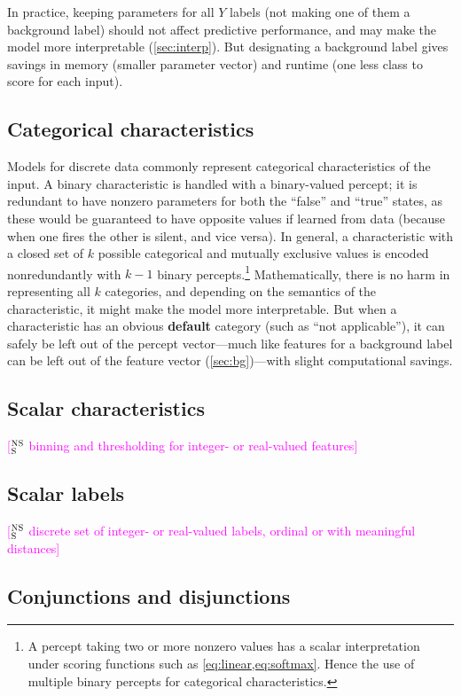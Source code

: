 \documentclass[11pt,letterpaper]{article}
\newcommand{\ensuretext}[1]{#1}
\newcommand{\nssmarker}{\ensuretext{\textcolor{magenta}{\ensuremath{^{\textsc{NS}}_{\textsc{S}}}}}}
\newcommand{\arkcomment}[3]{\ensuretext{\textcolor{#3}{[#1 #2]}}}
\newcommand{\nss}[1]{\arkcomment{\nssmarker}{#1}{magenta}}
\begin{document}
In practice, keeping parameters for all $Y$ labels (not making one of them a background label) 
should not affect predictive performance, and may make the model more interpretable (\cref{sec:interp}).
But designating a background label gives savings in memory (smaller parameter vector) and runtime (one less class to score for each input).

\subsection{Categorical characteristics}

Models for discrete data commonly represent categorical characteristics of the input.
A binary characteristic is handled with a binary-valued percept; it is redundant to have 
nonzero parameters for both the ``false'' and ``true'' states, as these would be guaranteed 
to have opposite values if learned from data (because when one fires the other is silent, and vice versa).
In general, a characteristic with a closed set of $k$ possible categorical and mutually exclusive values 
is encoded nonredundantly with $k-1$ binary percepts.\footnote{A percept taking two or more nonzero values has a scalar 
interpretation under scoring functions such as \cref{eq:linear,eq:softmax}. 
Hence the use of multiple binary percepts for categorical characteristics.}
Mathematically, there is no harm in representing all $k$ categories, 
and depending on the semantics of the characteristic, it might make the model more interpretable.
But when a characteristic has an obvious {\bf default} category (such as ``not applicable''),
it can safely be left out of the percept vector---much like features for a background label 
can be left out of the feature vector (\cref{sec:bg})---with slight computational savings.

\subsection{Scalar characteristics}

\nss{binning and thresholding for integer- or real-valued features}

\subsection{Scalar labels}

\nss{discrete set of integer- or real-valued labels, ordinal or with meaningful distances}

\subsection{Conjunctions and disjunctions}\label{sec:complex}
\end{document}
